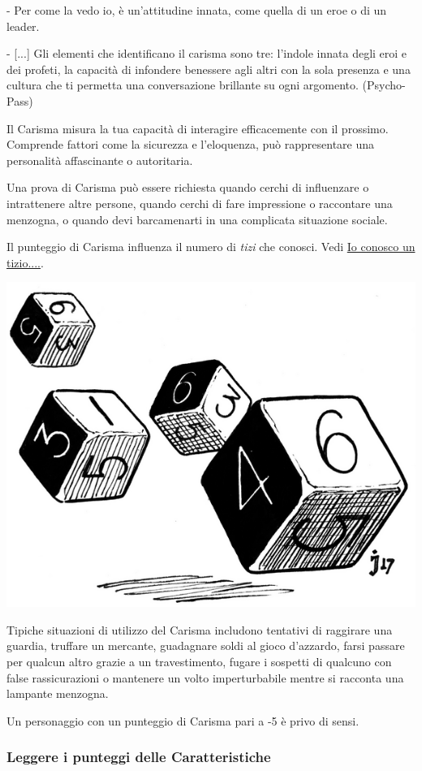 \begin{multicols}{2}
\begin{enfasi}
{- Per come la vedo io, è un'attitudine innata, come quella di un eroe o di un leader.

- [...] Gli elementi che identificano il carisma sono tre: l'indole innata degli eroi e dei profeti, la capacità di infondere benessere agli altri con la sola presenza e una cultura che ti permetta una conversazione brillante su ogni argomento. (Psycho-Pass)
}\end{enfasi}

Il Carisma misura la tua capacità di interagire efficacemente con il prossimo. Comprende fattori come la sicurezza e l'eloquenza, può rappresentare una personalità affascinante o autoritaria.

Una prova di Carisma può essere richiesta quando cerchi di influenzare o intrattenere altre persone, quando cerchi di fare impressione o raccontare una menzogna, o quando devi barcamenarti in una complicata situazione sociale.

Il punteggio di Carisma influenza il numero di \emph{tizi} che conosci. Vedi \hyperlink{ioconoscountizio}{Io conosco un tizio....}.

\begin{center}
\includegraphics[width=0.7\linewidth]{immagini/dice4.png}
\end{center}

Tipiche situazioni di utilizzo del Carisma includono tentativi di raggirare una guardia, truffare un mercante, guadagnare soldi al gioco d'azzardo, farsi passare per qualcun altro grazie a un travestimento, fugare i sospetti di qualcuno con false rassicurazioni o mantenere un volto imperturbabile mentre si racconta una lampante menzogna.

Un personaggio con un punteggio di Carisma pari a -5 è privo di sensi.

\subsubsection{Leggere i punteggi delle Caratteristiche}\label{leggereipunteggidellecaratteristiche}


\end{multicols}
